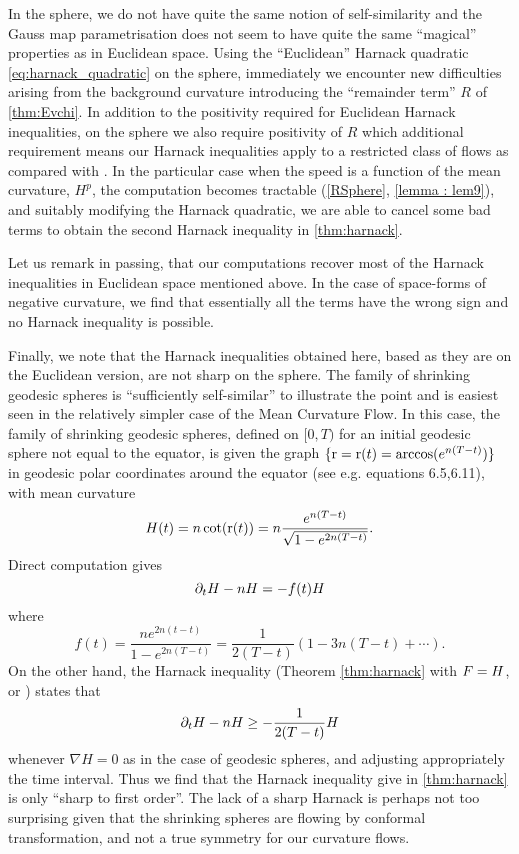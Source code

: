 \documentclass{amsart}
\begin{document}
In the sphere, we do not have quite the same notion of self-similarity and the Gauss map parametrisation does not seem to have quite the same ``magical'' properties as in Euclidean space. Using the ``Euclidean'' Harnack quadratic \cref{eq:harnack_quadratic} on the sphere, immediately we encounter new difficulties arising from the background curvature introducing the ``remainder term'' $R$ of \cref{thm:Evchi}. In addition to the positivity required for Euclidean Harnack inequalities, on the sphere we also require positivity of $R$ which additional requirement means our Harnack inequalities apply to a restricted class of flows as compared with \cite{MR1296393}. In the particular case when the speed is a function of the mean curvature, \(H^p\), the computation becomes tractable (\cref{RSphere}, \cref{lemma : lem9}), and suitably modifying the Harnack quadratic, we are able to cancel some bad terms to obtain the second Harnack inequality in \cref{thm:harnack}. 

Let us remark in passing, that our computations recover most of the Harnack inequalities in Euclidean space mentioned above. In the case of space-forms of negative curvature, we find that essentially all the terms have the wrong sign and no Harnack inequality is possible.

Finally, we note that the Harnack inequalities obtained here, based as they are on the Euclidean version, are not sharp on the sphere. The family of shrinking geodesic spheres is ``sufficiently self-similar'' to illustrate the point and is easiest seen in the relatively simpler case of the Mean Curvature Flow. In this case, the family of shrinking geodesic spheres, defined on $[0, T)$ for an initial geodesic sphere not equal to the equator, is given the graph \(\{\operatorname{r} = \operatorname{r}(t) = \arccos(e^{n(T-t)})\}\) in geodesic polar coordinates around the equator (see e.g. \cite{Gerhardt:/2015} equations 6.5,6.11), with mean curvature
\[
H(t) = n\cot(\operatorname{r}(t)) = n\frac{e^{n(T-t)}}{\sqrt{1 - e^{2n(T-t)}}}.
\]
Direct computation gives
\[
\partial_t H - n H = - f(t) H
\]
where
\[
f(t) = \frac{n e^{2n(t-t)}}{1 - e^{2n(T-t)}} = \frac{1}{2(T-t)}(1 - 3n(T-t) + \cdots).
\]
On the other hand, the Harnack inequality (Theorem \ref{thm:harnack} with \(F = H\), or \cite{IvakiBryan:08/2015}) states that
\[
\partial_t H - n H \geq - \frac{1}{2(T-t)} H
\]
whenever \(\nabla H = 0\) as in the case of geodesic spheres, and adjusting appropriately the time interval. Thus we find that the Harnack inequality give in \cref{thm:harnack} is only ``sharp to first order''. The lack of a sharp Harnack is perhaps not too surprising given that the shrinking spheres are flowing by conformal transformation, and not a true symmetry for our curvature flows. 
\end{document}
